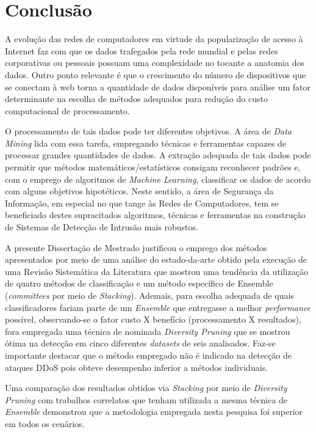 \chapter{Conclusão}
\label{conclusoes}

A evolução das redes de computadores em virtude da popularização de acesso à Internet faz com que os dados trafegados pela rede mundial e pelas redes corporativas ou pessoais possuam uma complexidade no tocante a anatomia dos dados. Outro ponto relevante é que o crescimento do número de dispositivos que se conectam à web torna a quantidade de dados disponíveis para análise um fator determinante na escolha de métodos adequados para redução do custo computacional de processamento.

O processamento de tais dados pode ter diferentes objetivos. A área de \textit{Data Mining} lida com essa tarefa, empregando técnicas e ferramentas capazes de processar grandes quantidades de dados. A extração adequada de tais dados pode permitir que métodos matemáticos/estatísticos consigam reconhecer padrões e, com o emprego de algoritmos de \textit{Machine Learning}, classificar os dados de acordo com alguns objetivos hipotéticos. Neste sentido, a área de Segurança da Informação, em especial no que tange às Redes de Computadores, tem se beneficiado destes supracitados algoritmos, técnicas e ferramentas na construção de Sistemas de Detecção de Intrusão mais robustos.

A presente Dissertação de Mestrado justificou o emprego dos métodos apresentados por meio de uma análise do estado-da-arte obtido pela execução de uma Revisão Sistemática da Literatura que mostrou uma tendência da utilização de quatro métodos de classificação e um método específico de Ensemble (\textit{committees} por meio de \textit{Stacking}). Ademais, para escolha adequada de quais classificadores fariam parte de um \textit{Ensemble} que entregasse a melhor \textit{performance} possível, observando-se o fator custo X benefício (processamento X resultados), fora empregada uma técnica de nominada \textit{Diversity Pruning} que se mostrou ótima na detecção em cinco diferentes \textit{datasets} de seis analisados. Faz-se importante destacar que o método empregado não é indicado na detecção de ataques DDoS pois obteve desempenho inferior a métodos individuais.


Uma comparação dos resultados obtidos via \textit{Stacking} por meio de \textit{Diversity Pruning} com trabalhos correlatos que tenham utilizada a mesma técnica de \textit{Ensemble} demonstrou que a metodologia empregada nesta pesquisa foi superior em todos os cenários.

